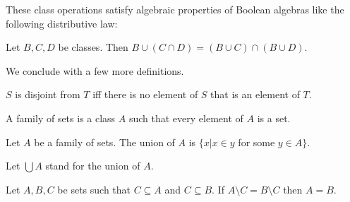 \documentclass{article}
\begin{document}
These class operations satisfy algebraic properties of Boolean algebras
like the following distributive law:
\begin{forthel}

\begin{proposition}
Let $B,C,D$ be classes. Then
$B \cup (C \cap D) = (B \cup C) \cap (B \cup D)$.
\end{proposition}
\end{forthel}
%
We conclude with a few more definitions.
%
\begin{forthel}
  \begin{definition}
    $S$ is disjoint from $T$ iff there is no element of $S$ that is an element
    of $T$.
  \end{definition}

  \begin{definition}
    A family of sets is a class $A$ such that every element of 
$A$ is a set.
  \end{definition}

\begin{definition}
Let $A$ be a family of sets. The union of $A$
is $ \{x | x \in y$ for some $y \in A\}$.
\end{definition}

Let $\bigcup A$ stand for the union of $A$.


\begin{lemma}
Let $A,B,C$ be sets such that $C \subseteq A$ and $C \subseteq B$.
If $A \setminus C = B \setminus C$ then $A = B$.
\end{lemma}


\end{forthel}
%
\end{document}
